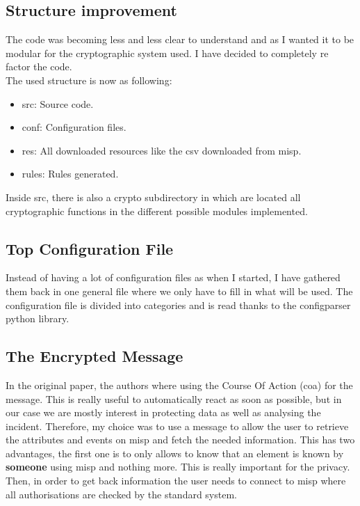 \documentclass{eplmastersthesis}
\begin{document}
\subsection{Structure improvement}
The code was becoming less and less clear to understand and as I wanted it to be modular for the cryptographic system used. I have decided to completely re factor the code.\\

The used structure is now as following:
\begin{itemize}
\item src: Source code.
\item conf: Configuration files.
\item res: All downloaded resources like the \gls{csv} downloaded from \gls{misp}.
\item rules: Rules generated.
\end{itemize}

Inside src, there is also a crypto subdirectory in which are located all cryptographic functions in the different possible modules implemented.

\subsection{Top Configuration File}
Instead of having a lot of configuration files as when I started, I have gathered them back in one general file where we only have to fill in what will be used.
The configuration file is divided into categories and is read thanks to the configparser python library.

\subsection{The Encrypted Message}
In the original paper, the authors where using the Course Of Action (\gls{coa}) for the message. This is really useful to automatically react as soon as possible, but in our case we are mostly interest in protecting data as well as analysing the incident.
Therefore, my choice was to use a message to allow the user to retrieve the attributes and events on \gls{misp} and fetch the needed information. This has two advantages, the first one is to only allows to know that an element is known by \textbf{someone} using \gls{misp} and nothing more. This is really important for the privacy. Then, in order to get back information the user needs to connect to \gls{misp} where all authorisations are checked by the standard system.\\
\end{document}
